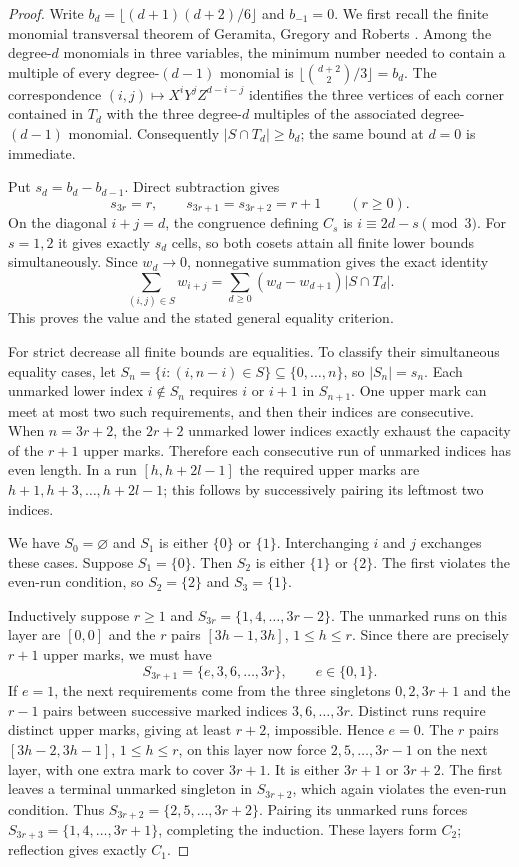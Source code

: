 \documentclass[11pt]{article}
\begin{document}
\begin{proof}
Write $b_d=\lfloor(d+1)(d+2)/6\rfloor$ and $b_{-1}=0$.
We first recall the finite monomial transversal theorem of Geramita,
Gregory and Roberts \cite[Theorem~5.4(1)]{ggr}. Among the degree-$d$
monomials in three variables, the minimum number needed to contain a
multiple of every degree-$(d-1)$ monomial is
$\lfloor\binom{d+2}{2}/3\rfloor=b_d$. The correspondence
$(i,j)\mapsto X^iY^jZ^{d-i-j}$ identifies the three vertices of each
corner contained in $T_d$ with the three degree-$d$ multiples of the
associated degree-$(d-1)$ monomial. Consequently $|S\cap T_d|\ge b_d$;
the same bound at $d=0$ is immediate.

Put $s_d=b_d-b_{d-1}$. Direct subtraction gives
\[
 s_{3r}=r,\qquad s_{3r+1}=s_{3r+2}=r+1\qquad(r\ge0).
\]
On the diagonal $i+j=d$, the congruence defining $C_s$ is
$i\equiv2d-s\pmod3$. For $s=1,2$ it gives exactly $s_d$ cells,
so both cosets attain all finite lower bounds simultaneously.
Since $w_d\to0$, nonnegative summation gives the exact identity
\[
 \sum_{(i,j)\in S}w_{i+j}
 =\sum_{d\ge0}(w_d-w_{d+1})|S\cap T_d|.
\]
This proves the value and the stated general equality criterion.

For strict decrease all finite bounds are equalities. To classify their
simultaneous equality cases, let
$S_n=\{i:(i,n-i)\in S\}\subseteq\{0,\ldots,n\}$, so $|S_n|=s_n$.
Each unmarked lower index $i\notin S_n$ requires $i$ or $i+1$ in
$S_{n+1}$. One upper mark can meet at most two such requirements, and
then their indices are consecutive. When $n=3r+2$, the $2r+2$
unmarked lower indices exactly exhaust the capacity of the $r+1$ upper
marks. Therefore each consecutive run of unmarked indices has even
length. In a run $[h,h+2l-1]$ the required upper marks are
$h+1,h+3,\ldots,h+2l-1$; this follows by successively pairing its
leftmost two indices.

We have $S_0=\varnothing$ and $S_1$ is either $\{0\}$ or $\{1\}$.
Interchanging $i$ and $j$ exchanges these cases. Suppose
$S_1=\{0\}$. Then $S_2$ is either $\{1\}$ or $\{2\}$. The first
violates the even-run condition, so $S_2=\{2\}$ and $S_3=\{1\}$.

Inductively suppose $r\ge1$ and
$S_{3r}=\{1,4,\ldots,3r-2\}$. The unmarked runs on this layer
are $[0,0]$ and the $r$ pairs $[3h-1,3h]$, $1\le h\le r$.
Since there are precisely $r+1$ upper marks, we must have
\[
 S_{3r+1}=\{e,3,6,\ldots,3r\},\qquad e\in\{0,1\}.
\]
If $e=1$, the next requirements come from the three singletons
$0,2,3r+1$ and the $r-1$ pairs between successive marked indices
$3,6,\ldots,3r$. Distinct runs require distinct upper marks, giving
at least $r+2$, impossible. Hence $e=0$. The $r$ pairs
$[3h-2,3h-1]$, $1\le h\le r$, on this layer now force
$2,5,\ldots,3r-1$ on the next layer, with one extra mark to cover
$3r+1$. It is either $3r+1$ or $3r+2$. The first leaves a terminal
unmarked singleton in $S_{3r+2}$, which again violates the even-run
condition. Thus $S_{3r+2}=\{2,5,\ldots,3r+2\}$. Pairing its
unmarked runs forces
$S_{3r+3}=\{1,4,\ldots,3r+1\}$, completing the induction.
These layers form $C_2$; reflection gives exactly $C_1$.
\end{proof}
\end{document}
